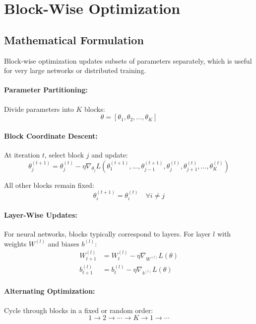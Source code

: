 \documentclass{tufte-handout}
\begin{document}
\section{Block-Wise Optimization}

\subsection{Mathematical Formulation}

Block-wise optimization updates subsets of parameters separately, which is useful for very large networks or distributed training.

\paragraph{Parameter Partitioning:}
Divide parameters into $K$ blocks:
\begin{equation}
\theta = [\theta_1, \theta_2, \ldots, \theta_K]
\end{equation}

\paragraph{Block Coordinate Descent:}
At iteration $t$, select block $j$ and update:
\begin{equation}
\theta_j^{(t+1)} = \theta_j^{(t)} - \eta \nabla_{\theta_j} L(\theta_1^{(t+1)}, \ldots, \theta_{j-1}^{(t+1)}, \theta_j^{(t)}, \theta_{j+1}^{(t)}, \ldots, \theta_K^{(t)})
\end{equation}

All other blocks remain fixed:
\begin{equation}
\theta_i^{(t+1)} = \theta_i^{(t)} \quad \forall i \neq j
\end{equation}

\paragraph{Layer-Wise Updates:}
For neural networks, blocks typically correspond to layers. For layer $l$ with weights $W^{(l)}$ and biases $b^{(l)}$:
\begin{align}
W^{(l)}_{t+1} &= W^{(l)}_t - \eta \nabla_{W^{(l)}} L(\theta) \\
b^{(l)}_{t+1} &= b^{(l)}_t - \eta \nabla_{b^{(l)}} L(\theta)
\end{align}

\paragraph{Alternating Optimization:}
Cycle through blocks in a fixed or random order:
\begin{equation}
1 \rightarrow 2 \rightarrow \cdots \rightarrow K \rightarrow 1 \rightarrow \cdots
\end{equation}
\end{document}
